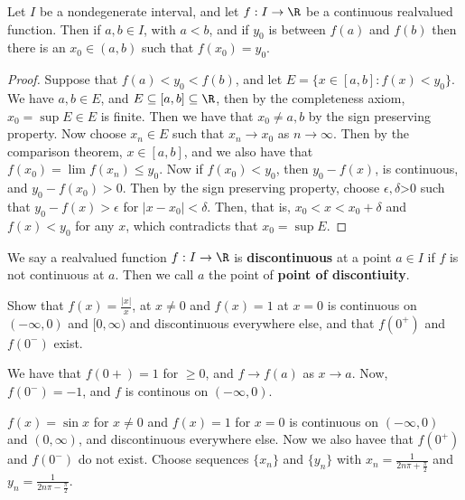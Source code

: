 \begin{theorem}\label{3.3.6}
    Let $I$ be a nondegenerate interval, and let  $f:I \rightarrow \R$ be a continuous realvalued 
    function. Then if  $a,b \in I$, with  $a<b$, and if  $y_0$ is between  $f(a)$ and  $f(b)$ 
    then there is an $x_0 \in (a,b)$ such that $f(x_0)=y_0$.
\end{theorem}
\begin{proof}
    Suppose that $f(a)<y_0<f(b)$, and let  $E=\{x \in [a,b]: f(x)<y_0\}$. We have
    $a,b \in E$, and  $E \subseteq [a,b]\subseteq \R$, then by the completeness axiom, 
    $x_0=\sup{E} \in E$ is finite. Then we have that $x_0 \neq a,b$ by the sign preserving 
    property. Now choose $x_n \in E$ such that  $x_n \rightarrow x_0$ as  $n \rightarrow \infty$. 
    Then by the comparison theorem,  $x \in [a,b]$, and we also have that 
    $f(x_0)=\lim{f(x_n)} \leq y_0$. Now if  $f(x_0)<y_0$, then  $y_0-f(x)$, is continuous, 
    and  $y_0-f(x_0)>0$. Then by the sign preserving property, choose  $\epsilon,\delta$>0 
    such that  $y_0-f(x)>\epsilon$ for $|x-x_0|< \delta$. Then, that is,  $x_0<x<x_0+\delta$ and 
    $f(x)<y_0$ for any  $x$, which contradicts that  $x_0=\sup{E}$.
\end{proof}

\begin{definition}
    We say a realvalued function $f:I \rightarrow \R$ is \textbf{discontinuous} 
    at a point $a \in I$ if  $f$ is not continuous at  $a$. Then we call  $a$ the point
    of \textbf{point of discontiuity}.
\end{definition}

\begin{example}
    Show that $f(x)=\frac{|x|}{x}$, at $x \neq 0$ and $f(x)=1$ at  $x=0$ is 
    continuous on  $(-\infty, 0)$ and  $[0, \infty)$ and discontinuous everywhere else, 
    and that $f(0^+)$ and  $f(0^-)$ exist.
\end{example} 
\begin{solution}
    We have that $f(0+)=1$ for  $ \geq 0$, and  $f \rightarrow f(a)$ as $x \rightarrow a$. 
    Now, $f(0^-)=-1$, and  $f$ is continous on  $(-\infty, 0)$.
\end{solution}
\begin{example}
    $f(x)=\sin{x}$ for $x \neq 0$ and  $f(x)=1$ for  $x=0$ is continuous on  $(-\infty,0)$ and 
    $(0,\infty)$, and discontinuous everywhere else. Now we also havee that  $f(0^+)$ and 
    $f(0^-)$ do not exist. Choose sequences  $\{x_n\}$ and  $\{y_n\}$ with  $x_n=\frac{1}{2n\pi+\frac{\pi}{2}}$ 
    and $y_n=\frac{1}{2n\pi-\frac{\pi}{2}}$.
\end{example} 

